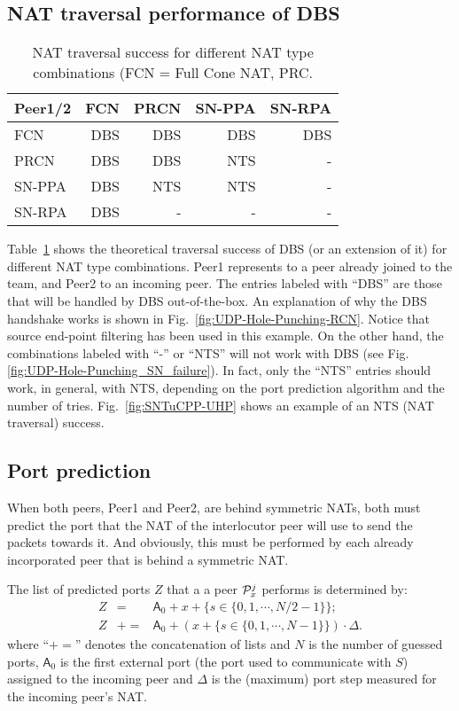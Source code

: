 \subsection{NAT traversal performance of DBS}

\begin{table}
  \centering
  \begin{tabular}{l|r|r|r|r}
    Peer1/2 & FCN   & PRCN  & SN-PPA & SN-RPA \\
    \hline
    FCN     & DBS   & DBS   & DBS    & DBS    \\
    PRCN    & DBS   & DBS   & NTS    & -      \\
    SN-PPA  & DBS   & NTS   & NTS    & -      \\
    SN-RPA  & DBS   & -     & -      & -
  \end{tabular}
  \caption{NAT traversal success for different NAT type combinations (FCN = Full Cone NAT, PRC.
    \label{tab:theoretical}}
\end{table}

Table~\ref{tab:theoretical} shows the theoretical traversal success of
DBS (or an extension of it) for different NAT type combinations. Peer1
represents to a peer already joined to the team, and Peer2 to an
incoming peer. The entries labeled with ``DBS'' are those that will be
handled by DBS out-of-the-box. An explanation of why the DBS handshake
works is shown in Fig.~\ref{fig:UDP-Hole-Punching-RCN}.  Notice that
source end-point filtering has been used in this example. On the other
hand, the combinations labeled with ``-'' or ``NTS'' will not work
with DBS (see Fig.\ref{fig:UDP-Hole-Punching_SN_failure}). In fact,
only the ``NTS'' entries should work, in general, with NTS, depending
on the port prediction algorithm and the number of
tries. Fig.~\ref{fig:SNTuCPP-UHP} shows an example of an NTS (NAT
traversal) success.

\subsection{Port prediction}
When both peers, Peer1 and Peer2, are behind symmetric NATs, both must
predict the port that the NAT of the interlocutor peer will use to
send the packets towards it. And obviously, this must be performed by
each already incorporated peer that is behind a symmetric NAT.

The list of predicted ports $Z$ that a a peer ${\cal P}^j_x$ performs
is determined by:
\begin{equation}
  \begin{array}{rcl}
    Z & = & \textsf{A}_0 + x + \{s\in\{0,1,\cdots,N/2-1\}\}; \\
    Z & += & \textsf{A}_0 + (x + \{s\in\{0,1,\cdots, N-1\}\}) \cdot \Delta.
  \end{array}
\end{equation}
where ``$+=$'' denotes the concatenation of lists and $N$ is the
number of guessed ports, $\textsf{A}_0$ is the first external port (the
port used to communicate with $S$) assigned to the incoming peer and
$\Delta$ is the (maximum) port step measured for the incoming peer's
NAT.

